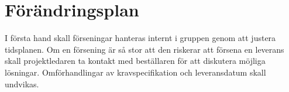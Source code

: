 \section{Förändringsplan}

I första hand skall förseningar hanteras internt i gruppen genom att justera tidsplanen. Om en försening är så stor att den riskerar att försena en leverans skall projektledaren ta kontakt med beställaren för att diskutera möjliga lösningar. Omförhandlingar av kravspecifikation och leveransdatum skall undvikas.